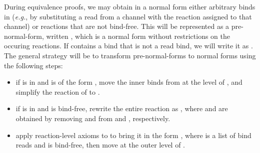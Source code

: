 During equivalence proofs, we may obtain 
in a normal form 
either arbitrary binds in  
(\emph{e.g.}, by substituting a read from a channel with the reaction
assigned to that channel)
or reactions  that are not bind-free.
This will be represented as a pre-normal-form, 
written 
, 
which is a normal form without restrictions on the occuring reactions.
If  contains a bind that is not a read bind, we will write it
as . 
The general strategy will be to transform pre-normal-forms 
to normal forms using the following steps:
\begin{itemize}
\item if  is in  and  is of the form
, move the inner binds from  at the level of , and simplify the reaction of  to .
\item if   is in  and  is bind-free,
rewrite the entire reaction as 
, where  and 
are obtained by removing  and  from  and , respectively.
\item apply reaction-level axioms to  to bring it in the form
, where  is a list of bind reads and  is
bind-free, then move  at the outer level of .
\end{itemize}    

